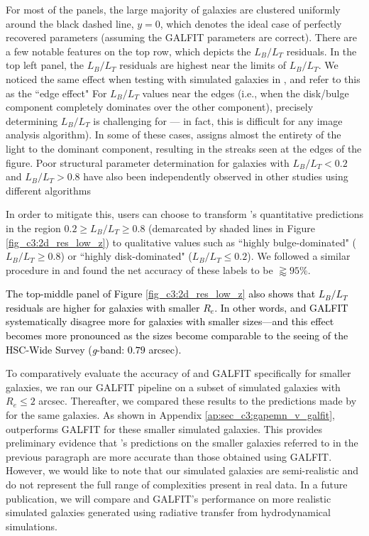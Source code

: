 For most of the panels, the large majority of galaxies are clustered uniformly around the black dashed line, $y = 0$, which denotes the ideal case of perfectly recovered parameters (assuming the GALFIT parameters are correct). There are a few notable features on the top row, which depicts the $L_B/L_T$ residuals.  In the top left panel, the $L_B/L_T$ residuals are highest near the limits of $L_B/L_T$. We noticed the same effect when testing \gampen{} with simulated galaxies in \citet{gampen_software_paper}, and refer to this as the ``edge effect" 
For $L_B/L_T$ values near the edges (i.e., when the disk/bulge component completely dominates over the other component), precisely determining $L_B/L_T$ is challenging for \gampen{} --- in fact, this is difficult for any image analysis algorithm). In some of these cases, \gampen{} assigns almost the entirety of the light to the dominant component, resulting in the streaks seen at the edges of the figure. Poor structural parameter determination for galaxies with $L_B/L_T < 0.2$ and $L_B/L_T>0.8$ have also been independently observed in other studies using different algorithms \citep[e.g.,][]{euclid_morph, galapagos}


In order to mitigate this, \gampen{} users can choose to transform \gampen{}'s quantitative predictions in the region $0.2 \geq L_B/L_T \geq 0.8$ (demarcated by shaded lines in Figure \ref{fig_c3:2d_res_low_z}) to qualitative values such as ``highly bulge-dominated" ($L_B/L_T \geq 0.8$) or ``highly disk-dominated" ($L_B/L_T \leq 0.2$). We followed a similar procedure in \citet{gampen_software_paper} and found the net accuracy of these labels to be $\gtrapprox95\%$.

\textcolor{black}{The top-middle panel of Figure \ref{fig_c3:2d_res_low_z} also shows that $L_B/L_T$ residuals are higher for galaxies with smaller $R_e$. In other words, \gampen{} and GALFIT systematically disagree more for galaxies with smaller sizes---and this effect becomes more pronounced as the sizes become comparable to the seeing of the HSC-Wide Survey (\textit{g}-band: $0.79$ arcsec).} 

To comparatively evaluate the accuracy of \gampen{} and GALFIT specifically for smaller galaxies, we ran our GALFIT pipeline on a subset of simulated galaxies with $R_e \leq 2$ arcsec. Thereafter, we compared these results to the predictions made by \gampen{} for the same galaxies. As shown in Appendix \ref{ap:sec_c3:gapemn_v_galfit}, \gampen{} outperforms GALFIT for these smaller simulated galaxies. This provides preliminary evidence that \gampen{}'s predictions on the smaller galaxies referred to in the previous paragraph are more accurate than those obtained using GALFIT. However, we would like to note that our simulated galaxies are semi-realistic and do not represent the full range of complexities present in real data. In a future publication, we will compare \gampen{} and GALFIT's performance on more realistic simulated galaxies generated using radiative transfer from hydrodynamical simulations.

